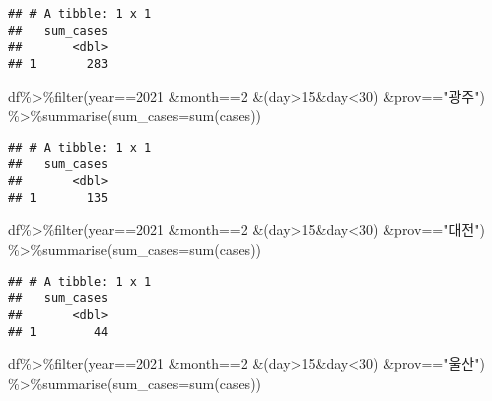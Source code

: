 \documentclass[
]{article}
\newenvironment{Shaded}{\begin{snugshade}}{\end{snugshade}}
\newcommand{\AttributeTok}[1]{\textcolor[rgb]{0.77,0.63,0.00}{#1}}
\newcommand{\DecValTok}[1]{\textcolor[rgb]{0.00,0.00,0.81}{#1}}
\newcommand{\FunctionTok}[1]{\textcolor[rgb]{0.00,0.00,0.00}{#1}}
\newcommand{\NormalTok}[1]{#1}
\newcommand{\SpecialCharTok}[1]{\textcolor[rgb]{0.00,0.00,0.00}{#1}}
\newcommand{\StringTok}[1]{\textcolor[rgb]{0.31,0.60,0.02}{#1}}
\begin{document}
\begin{verbatim}
## # A tibble: 1 x 1
##   sum_cases
##       <dbl>
## 1       283
\end{verbatim}

\begin{Shaded}
\begin{Highlighting}[]
\NormalTok{df}\SpecialCharTok{\%\textgreater{}\%}\FunctionTok{filter}\NormalTok{(year}\SpecialCharTok{==}\DecValTok{2021} \SpecialCharTok{\&}\NormalTok{month}\SpecialCharTok{==}\DecValTok{2} \SpecialCharTok{\&}\NormalTok{(day}\SpecialCharTok{\textgreater{}}\DecValTok{15}\SpecialCharTok{\&}\NormalTok{day}\SpecialCharTok{\textless{}}\DecValTok{30}\NormalTok{) }\SpecialCharTok{\&}\NormalTok{prov}\SpecialCharTok{==}\StringTok{"광주"}\NormalTok{) }\SpecialCharTok{\%\textgreater{}\%}\FunctionTok{summarise}\NormalTok{(}\AttributeTok{sum\_cases=}\FunctionTok{sum}\NormalTok{(cases))}
\end{Highlighting}
\end{Shaded}

\begin{verbatim}
## # A tibble: 1 x 1
##   sum_cases
##       <dbl>
## 1       135
\end{verbatim}

\begin{Shaded}
\begin{Highlighting}[]
\NormalTok{df}\SpecialCharTok{\%\textgreater{}\%}\FunctionTok{filter}\NormalTok{(year}\SpecialCharTok{==}\DecValTok{2021} \SpecialCharTok{\&}\NormalTok{month}\SpecialCharTok{==}\DecValTok{2} \SpecialCharTok{\&}\NormalTok{(day}\SpecialCharTok{\textgreater{}}\DecValTok{15}\SpecialCharTok{\&}\NormalTok{day}\SpecialCharTok{\textless{}}\DecValTok{30}\NormalTok{) }\SpecialCharTok{\&}\NormalTok{prov}\SpecialCharTok{==}\StringTok{"대전"}\NormalTok{) }\SpecialCharTok{\%\textgreater{}\%}\FunctionTok{summarise}\NormalTok{(}\AttributeTok{sum\_cases=}\FunctionTok{sum}\NormalTok{(cases))}
\end{Highlighting}
\end{Shaded}

\begin{verbatim}
## # A tibble: 1 x 1
##   sum_cases
##       <dbl>
## 1        44
\end{verbatim}

\begin{Shaded}
\begin{Highlighting}[]
\NormalTok{df}\SpecialCharTok{\%\textgreater{}\%}\FunctionTok{filter}\NormalTok{(year}\SpecialCharTok{==}\DecValTok{2021} \SpecialCharTok{\&}\NormalTok{month}\SpecialCharTok{==}\DecValTok{2} \SpecialCharTok{\&}\NormalTok{(day}\SpecialCharTok{\textgreater{}}\DecValTok{15}\SpecialCharTok{\&}\NormalTok{day}\SpecialCharTok{\textless{}}\DecValTok{30}\NormalTok{) }\SpecialCharTok{\&}\NormalTok{prov}\SpecialCharTok{==}\StringTok{"울산"}\NormalTok{) }\SpecialCharTok{\%\textgreater{}\%}\FunctionTok{summarise}\NormalTok{(}\AttributeTok{sum\_cases=}\FunctionTok{sum}\NormalTok{(cases))}
\end{Highlighting}
\end{Shaded}
\end{document}
